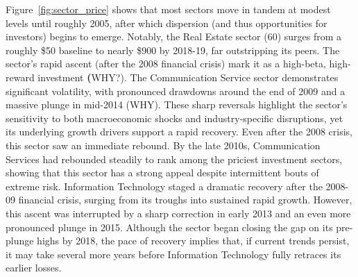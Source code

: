 \begin{table}[H]
    \centering
    \caption{\textit{Variance inflation factors}}
    \label{tab:vif}
\end{table}

Figure~\ref{fig:sector_price} shows that most sectors move in tandem at modest levels until roughly 2005, after which dispersion (and thus opportunities for investors) begins to emerge. Notably, the Real Estate sector (60) surges from a roughly \$50 baseline to nearly \$900 by 2018-19, far outstripping its peers. The sector's rapid ascent (after the 2008 financial crisis) mark it as a high-beta, high-reward investment \textbf(WHY?). The Communication Service sector demonstrates significant volatility, with pronounced drawdowns around the end of 2009 and a massive plunge in mid-2014 (WHY). These sharp reversals highlight the sector's sensitivity to both macroeconomic shocks and industry-specific disruptions, yet its underlying growth drivers support a rapid recovery. Even after the 2008 crisis, this sector saw an immediate rebound. By the late 2010s, Communication Services had rebounded steadily to rank among the priciest investment sectors, showing that this sector has a strong appeal despite intermittent bouts of extreme risk. Information Technology staged a dramatic recovery after the 2008-09 financial crisis, surging from its troughs into sustained rapid growth. However, this ascent was interrupted by a sharp correction in early 2013 and an even more pronounced plunge in 2015. Although the sector began closing the gap on its pre-plunge highs by 2018, the pace of recovery implies that, if current trends persist, it may take several more years before Information Technology fully retraces its earlier losses.



